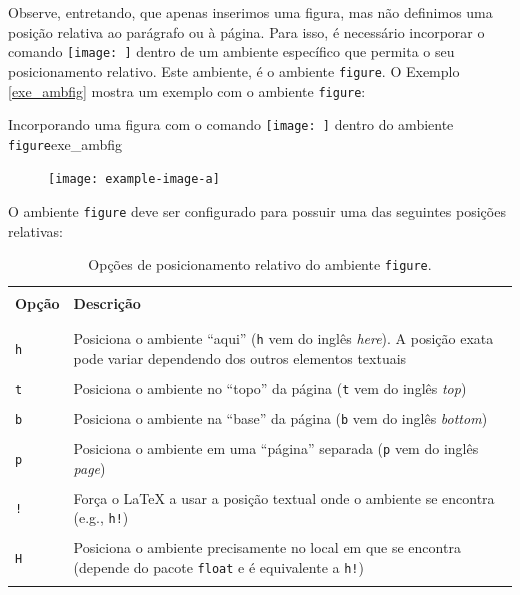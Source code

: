 Observe, entretando, que apenas inserimos uma figura, mas não definimos uma posição relativa ao parágrafo ou à página. Para isso, é necessário incorporar o comando \texttt{\texttt{[image: ]}} dentro de um ambiente específico que permita o seu posicionamento relativo. Este ambiente, é o ambiente {\tt figure}. O Exemplo \ref{exe_ambfig} mostra um exemplo com o ambiente {\tt figure}:

\begin{texexptitled}[breakable,enhanced,middle=2mm]{Incorporando uma figura com o comando \texttt{\texttt{[image: ]}} dentro do ambiente {\tt figure}}{exe_ambfig}
\begin{figure}[h]
\texttt{[image: example-image-a]}
\end{figure}
\end{texexptitled}

O ambiente {\tt figure} deve ser configurado para possuir uma das seguintes posições relativas:

\begin{table}[H]
\centering
\caption{Opções de posicionamento relativo do ambiente {\tt figure}.}
\label{tab:ambfig}
    \begin{tabular}{p{2cm}p{11cm}}
    \hline
    \\[-0.5em]
    \textbf{Opção} & \textbf{Descrição} \\
    \\[-0.5em]
    \hline
    \hline
    \\[-0.5em]
    {\tt h} & Posiciona o ambiente ``aqui'' ({\tt h} vem do inglês \textit{here}). A posição exata pode variar dependendo dos outros elementos textuais \\
    \\[-0.5em]
    {\tt t} & Posiciona o ambiente no ``topo'' da página ({\tt t} vem do inglês \textit{top}) \\
    \\[-0.5em]
    {\tt b} & Posiciona o ambiente na ``base'' da página ({\tt b} vem do inglês \textit{bottom}) \\
    \\[-0.5em]
    {\tt p} & Posiciona o ambiente em uma ``página'' separada ({\tt p} vem do inglês \textit{page}) \\
    \\[-0.5em]
    {\tt !} & Força o LaTeX a usar a posição textual onde o ambiente se encontra (e.g., {\tt h!}) \\
    \\[-0.5em]
    {\tt H} & Posiciona o ambiente precisamente no local em que se encontra (depende do pacote {\tt float} e é equivalente a {\tt h!}) \\
    \\[-0.5em]
    \hline
    \end{tabular}
\end{table}


